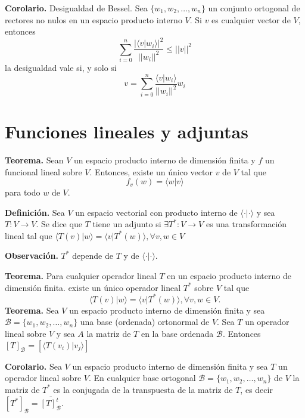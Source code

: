 \newpage

\textbf{Corolario.}  Desigualdad de Bessel. Sea $\{w_{1}, w_{2}, \dots, w_{n}\}$
un conjunto ortogonal de rectores no nulos en un espacio producto interno $V$.
Si $v$ es cualquier vector de $V$, entonces
$$\displaystyle{\sum_{i=0}^{n}}\frac{|\langle v|w_{i}\rangle|^{2}}{||w_{i}||^2}\leq||v||^{2}$$
la desigualdad vale si, y solo si
$$v=\displaystyle{\sum_{i=0}^{n}} \frac{\langle v|w_{i} \rangle}{||w_{i}||^2}w_{i}$$

\section{Funciones lineales y adjuntas}

\textbf{Teorema.} Sean $V$ un espacio producto interno de dimensión finita y $f$ un
funcional lineal sobre $V$. Entonces, existe un único vector $v$ de $V$ tal que
$$f_{v}(w) = \langle w|v \rangle$$
para todo $w$ de $V$.

\textbf{Definición.} Sea $V$ un espacio vectorial con producto interno de
$\langle \cdot | \cdot \rangle$ y sea $T : V \to V$. Se dice que $T$ tiene
un adjunto si $\exists T^{\ast} : V \to V$  es una transformación lineal tal que
$\langle  T(v) | w \rangle=\langle  v | T^{\ast}(w) \rangle, \forall v, w \in V$

\textbf{Observación.} $T^{\ast}$ depende de $T$ y de $\langle \cdot | \cdot \rangle$.

\textbf{Teorema.} Para cualquier operador lineal $T$ en un espacio producto
interno de dimensión finita. existe un único operador lineal $T^{\ast}$ sobre
$V$ tal que $$\langle  T(v) | w \rangle=\langle  v | T^{\ast}(w) \rangle,
\forall v, w \in V.$$
\textbf{Teorema.} Sea $V$ un espacio producto interno de dimensión
finita y sea $\mathcal{B}=\{w_{1}, w_{2}, \dots, w_{n}\}$ una base
(ordenada) ortonormal de $V$. Sea $T$ un operador lineal sobre $V$
y sea $A$ la matriz de $T$ en la base ordenada $\mathcal{B}$. Entonces
$[T]_{\mathcal{B}}=[\langle  T(v_{i}) | v_{j}\rangle]$

\textbf{Corolario.} Sea $V$ un espacio producto interno de dimensión
finita y sea $T$ un operador lineal sobre $V$. En cualquier base
ortogonal $\mathcal{B}=\{w_{1}, w_{2}, \dots, w_{n}\}$ de $V$
la matriz de $T^{\ast}$ es la conjugada de la transpuesta de la
matriz de $T$, es decir $[T^{\ast}]_{\mathcal{B}} =\overline{[T]
	_{\mathcal{B}}^{t}}$.



